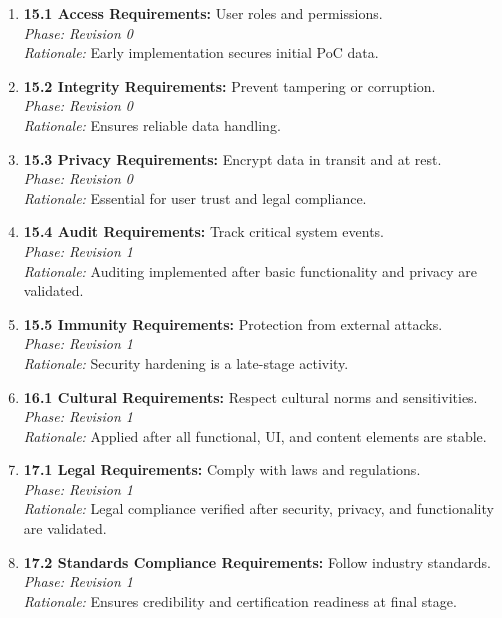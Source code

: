 \documentclass[11pt]{article}
\begin{document}
\begin{enumerate}
    \item \textbf{15.1 Access Requirements:} User roles and permissions.\\
    \textit{Phase: Revision 0} \\
    \textit{Rationale:} Early implementation secures initial PoC data.

    \item \textbf{15.2 Integrity Requirements:} Prevent tampering or corruption.\\
    \textit{Phase: Revision 0} \\
    \textit{Rationale:} Ensures reliable data handling.

    \item \textbf{15.3 Privacy Requirements:} Encrypt data in transit and at rest.\\
    \textit{Phase: Revision 0} \\
    \textit{Rationale:} Essential for user trust and legal compliance.

    \item \textbf{15.4 Audit Requirements:} Track critical system events.\\
    \textit{Phase: Revision 1} \\
    \textit{Rationale:} Auditing implemented after basic functionality and privacy are validated.

    \item \textbf{15.5 Immunity Requirements:} Protection from external attacks.\\
    \textit{Phase: Revision 1} \\
    \textit{Rationale:} Security hardening is a late-stage activity.

    \item \textbf{16.1 Cultural Requirements:} Respect cultural norms and sensitivities.\\
    \textit{Phase: Revision 1} \\
    \textit{Rationale:} Applied after all functional, UI, and content elements are stable.

    \item \textbf{17.1 Legal Requirements:} Comply with laws and regulations.\\
    \textit{Phase: Revision 1} \\
    \textit{Rationale:} Legal compliance verified after security, privacy, and functionality are validated.

    \item \textbf{17.2 Standards Compliance Requirements:} Follow industry standards.\\
    \textit{Phase: Revision 1} \\
    \textit{Rationale:} Ensures credibility and certification readiness at final stage.
\end{enumerate}
\end{document}
